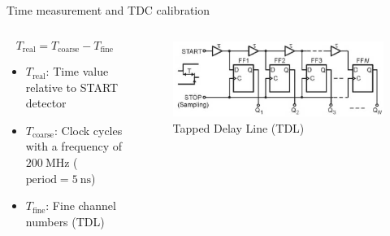 \documentclass{ikpKoeln}
\begin{document}
\begin{frame}[t]{Time measurement and TDC calibration}
\begin{columns}[c]
\begin{column}{0.45 \textwidth}
			\vspace{-0.5em}
			$$T_\text{real} = T_\text{coarse} - T_\text{fine}$$
			\vspace{-1em}
			\small
			{
				\begin{itemize}
					\item $T_\text{real}$: Time value relative to START detector
					\item $T_\text{coarse}$: Clock cycles with a frequency of $\qty{200}{\MHz}$ ($\text{period} = \qty{5}{\nano\second}$)
					\item $T_\text{fine}$: Fine channel numbers (TDL)
				\end{itemize}
			}
		\end{column}
		\begin{column}{0.5 \textwidth}
			\begin{figure}
				\vspace{-0.8em}\includegraphics[width = \textwidth]{r3b/TDCFineTime}
				\caption*{Tapped Delay Line (TDL)}
			\end{figure}
			\vspace{-2.3em}
		\end{column}
	\end{columns}
\end{frame}
\end{document}

